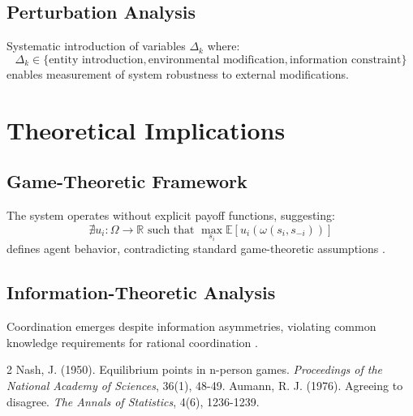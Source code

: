 \documentclass{article}
\begin{document}
\subsection{Perturbation Analysis}
Systematic introduction of variables $\Delta_k$ where:
$$\Delta_k \in \{\text{entity introduction}, \text{environmental modification}, \text{information constraint}\}$$
enables measurement of system robustness to external modifications.

\section{Theoretical Implications}

\subsection{Game-Theoretic Framework}
The system operates without explicit payoff functions, suggesting:
$$\nexists u_i: \Omega \rightarrow \mathbb{R} \text{ such that } \max_{s_i} \mathbb{E}[u_i(\omega(s_i, s_{-i}))]$$
defines agent behavior, contradicting standard game-theoretic assumptions \cite{nash1950equilibrium}.

\subsection{Information-Theoretic Analysis}
Coordination emerges despite information asymmetries, violating common knowledge requirements for rational coordination \cite{aumann1976agreeing}.


\begin{thebibliography}{2}
 Nash, J. (1950). Equilibrium points in n-person games. \textit{Proceedings of the National Academy of Sciences}, 36(1), 48-49.
 Aumann, R. J. (1976). Agreeing to disagree. \textit{The Annals of Statistics}, 4(6), 1236-1239.
\end{thebibliography}
\end{document}
